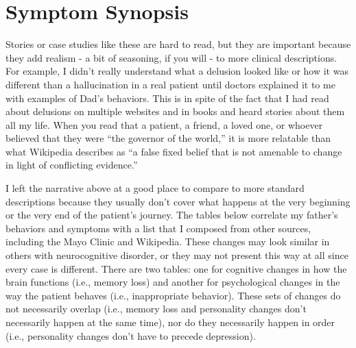 \documentclass{article}
\begin{document}
\section*{Symptom Synopsis}

Stories or case studies like these are hard to read, but they are important because they add realism - a bit of seasoning, if you will - to more clinical descriptions. For example, I didn't really understand what a delusion looked like or how it was different than a hallucination in a real patient until doctors explained it to me with examples of Dad's behaviors. This is in spite of the fact that I had read about delusions on multiple websites and in books and heard stories about them all my life. When you read that a patient, a friend, a loved one, or whoever believed that they were ``the governor of the world,'' it is more relatable than what Wikipedia describes as ``a false fixed belief that is not amenable to change in light of conflicting evidence.''

I left the narrative above at a good place to compare to more standard descriptions because they usually don't cover what happens at the very beginning or the very end of the patient's journey. The tables below correlate my father's behaviors and symptoms with a list that I composed from other sources, including the Mayo Clinic and Wikipedia. These changes may look similar in others with neurocognitive disorder, or they may not present this way at all since every case is different. There are two tables: one for cognitive changes in how the brain functions (i.e., memory loss) and another for psychological changes in the way the patient behaves (i.e., inappropriate behavior). These sets of changes do not necessarily overlap (i.e., memory loss and personality changes don't necessarily happen at the same time), nor do they necessarily happen in order (i.e., personality changes don't have to precede depression).
\end{document}
